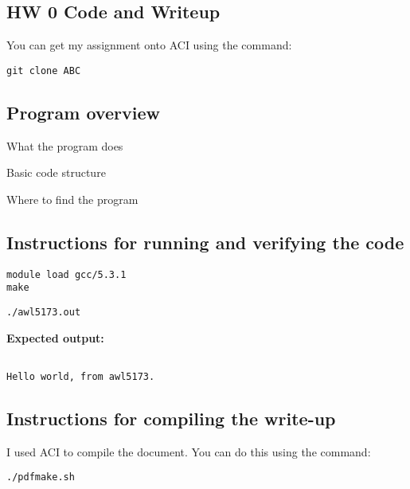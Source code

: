 \documentclass{article}
\begin{document}
\begin{spacing}{1.1}
\section{HW 0 Code and Writeup}

You can get my assignment onto ACI using the command:

\begin{verbatim}
git clone ABC
\end{verbatim}


\subsection{Program overview}

What the program does

Basic code structure

Where to find the program

\subsection{Instructions for running and verifying the code}

\begin{verbatim}
module load gcc/5.3.1
make
\end{verbatim}

\begin{verbatim}
./awl5173.out 
\end{verbatim}

\textbf{Expected output:}
\begin{verbatim}

Hello world, from awl5173.
\end{verbatim}

\subsection{Instructions for compiling the write-up}

I used ACI to compile the document.  You can do this using the command:
\begin{verbatim}
./pdfmake.sh
\end{verbatim}




\end{spacing}
\end{document}
